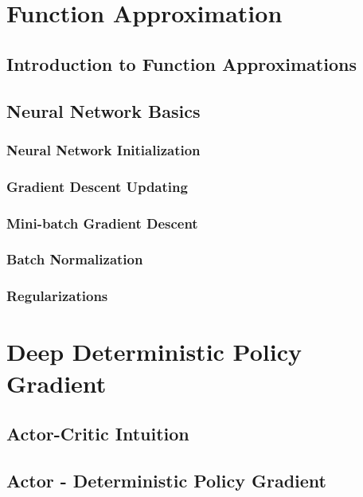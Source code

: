 

\section{Function Approximation}
\subsection{Introduction to Function Approximations}
\subsection{Neural Network Basics}
\subsubsection{Neural Network Initialization}
\subsubsection{Gradient Descent Updating}
\subsubsection{Mini-batch Gradient Descent}
\subsubsection{Batch Normalization}
\subsubsection{Regularizations}




\section{Deep Deterministic Policy Gradient}
\subsection{Actor-Critic Intuition}
\subsection{Actor - Deterministic Policy Gradient}
